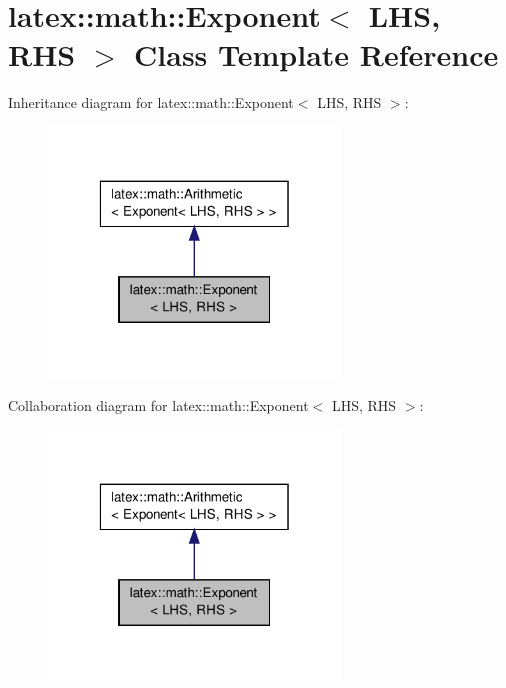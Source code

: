 \hypertarget{classlatex_1_1math_1_1Exponent}{\section{latex\-:\-:math\-:\-:Exponent$<$ L\-H\-S, R\-H\-S $>$ Class Template Reference}
\label{classlatex_1_1math_1_1Exponent}
}


Inheritance diagram for latex\-:\-:math\-:\-:Exponent$<$ L\-H\-S, R\-H\-S $>$\-:
\nopagebreak
\begin{figure}[H]
\begin{center}
\leavevmode
\includegraphics[width=220pt]{classlatex_1_1math_1_1Exponent__inherit__graph}
\end{center}
\end{figure}


Collaboration diagram for latex\-:\-:math\-:\-:Exponent$<$ L\-H\-S, R\-H\-S $>$\-:
\nopagebreak
\begin{figure}[H]
\begin{center}
\leavevmode
\includegraphics[width=220pt]{classlatex_1_1math_1_1Exponent__coll__graph}
\end{center}
\end{figure}
